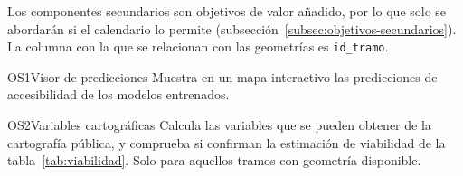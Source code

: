 Los componentes secundarios son objetivos de valor añadido, por lo que solo se abordarán si el calendario lo permite (subsección~\ref{subsec:objetivos-secundarios}).  La columna con la que se relacionan con las geometrías es \texttt{id\_tramo}.
\\

\begin{fichasecundaria}{OS1}{Visor de predicciones}{}
  Muestra en un mapa interactivo las predicciones de accesibilidad de los modelos entrenados.
\end{fichasecundaria}

\begin{fichasecundaria}{OS2}{Variables cartográficas}{}
  Calcula las variables que se pueden obtener de la cartografía pública, y comprueba si confirman la estimación de viabilidad de la tabla~\ref{tab:viabilidad}. Solo para aquellos tramos con geometría disponible.
\end{fichasecundaria}